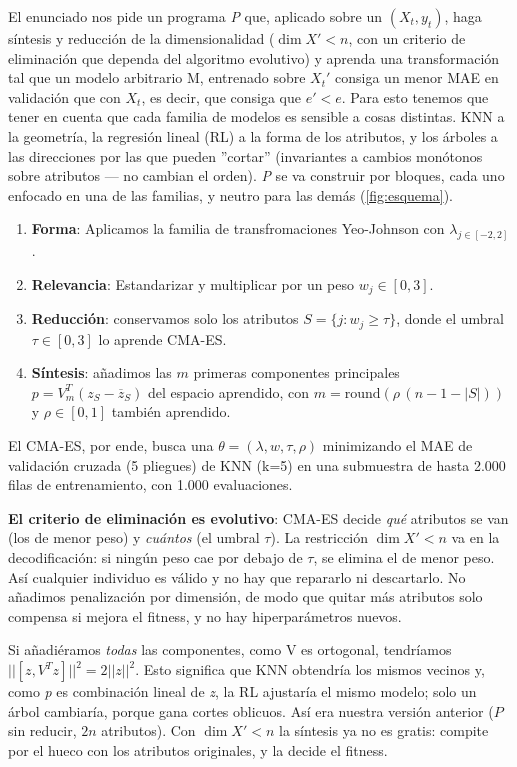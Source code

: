 \documentclass[apuntes,doscolumnas]{uc3mmaster}
\begin{document}
El enunciado nos pide un programa \textit{P} que, aplicado sobre un $(X_{t}, y_{t})$, haga síntesis y reducción de la dimensionalidad ($\dim X' < n$, con un criterio de eliminación que dependa del algoritmo evolutivo) y aprenda una transformación tal que un modelo arbitrario M, entrenado sobre $X_{t}'$ consiga un menor MAE en validación que con $X_{t}$, es decir, que consiga que $e'<e$. Para esto tenemos que tener en cuenta que cada familia de modelos es sensible a cosas distintas. KNN a la geometría, la regresión lineal (RL) a la forma de los atributos, y los árboles a las direcciones por las que pueden ''cortar'' (invariantes a cambios monótonos sobre atributos --- no cambian el orden). \textit{P} se va construir por bloques, cada uno enfocado en una de las familias, y neutro para las demás (\autoref{fig:esquema}). 
\begin{enumerate}
    \item \textbf{Forma}: Aplicamos la familia de transfromaciones Yeo-Johnson con $\lambda_{j\in [-2,2]}$. 
    \item \textbf{Relevancia}: Estandarizar y multiplicar por un peso $w_{j}\in[0,3]$.
    \item \textbf{Reducción}: conservamos solo los atributos $S=\{j: w_j\ge\tau\}$, donde el umbral $\tau\in[0,3]$ lo aprende CMA-ES.
    \item \textbf{Síntesis}: añadimos las $m$ primeras componentes principales $p=V_m^T (z_S-\overline{z}_S)$ del espacio aprendido, con $m=\mathrm{round}(\rho\,(n-1-|S|))$ y $\rho\in[0,1]$ también aprendido.
\end{enumerate}

El CMA-ES, por ende, busca una $\theta = (\lambda, w, \tau, \rho)$ minimizando el MAE de validación cruzada (5 pliegues) de KNN (k=5) en una submuestra de hasta 2.000 filas de entrenamiento, con 1.000 evaluaciones.

\textbf{El criterio de eliminación es evolutivo}: CMA-ES decide \textit{qué} atributos se van (los de menor peso) y \textit{cuántos} (el umbral $\tau$). La restricción $\dim X'<n$ va en la decodificación: si ningún peso cae por debajo de $\tau$, se elimina el de menor peso. Así cualquier individuo es válido y no hay que repararlo ni descartarlo. No añadimos penalización por dimensión, de modo que quitar más atributos solo compensa si mejora el fitness, y no hay hiperparámetros nuevos.

\begin{resultado}
    Si añadiéramos \textit{todas} las componentes, como V es ortogonal, tendríamos $|| [z,V^Tz]|| ^2 = 2||z||^2$. Esto significa que KNN obtendría los mismos vecinos y, como \textit{p} es combinación lineal de \textit{z}, la RL ajustaría el mismo modelo; solo un árbol cambiaría, porque gana cortes oblicuos. Así era nuestra versión anterior ($P$ sin reducir, $2n$ atributos). Con $\dim X'<n$ la síntesis ya no es gratis: compite por el hueco con los atributos originales, y la decide el fitness.
\end{resultado}
\end{document}
